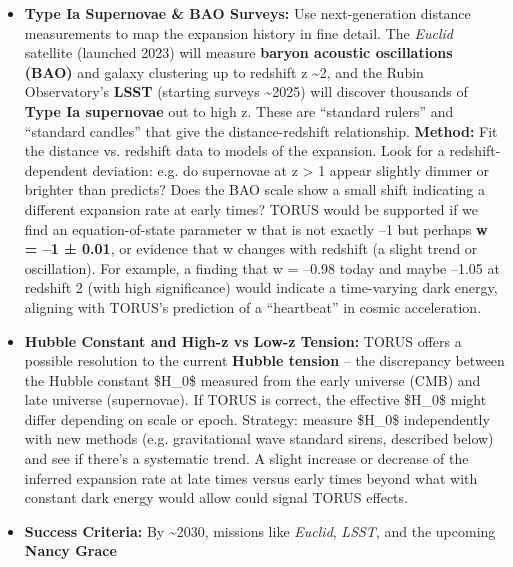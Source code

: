 \documentclass[
]{article}
\begin{document}
{\begin{itemize}
  \begin{itemize}
  \item
    \textbf{Type Ia Supernovae \& BAO Surveys:} Use next-generation
    distance measurements to map the expansion history in fine detail.
    The \emph{Euclid} satellite (launched 2023) will measure
    \textbf{baryon acoustic oscillations (BAO)} and galaxy clustering up
    to redshift z \textasciitilde2, and the Rubin Observatory's
    \textbf{LSST} (starting surveys \textasciitilde2025) will discover
    thousands of \textbf{Type Ia supernovae} out to high z. These are
    ``standard rulers'' and ``standard candles'' that give the
    distance-redshift relationship. \textbf{Method:} Fit the distance
    vs. redshift data to models of the expansion. Look for a
    redshift-dependent deviation: e.g. do supernovae at z \textgreater{}
    1 appear slightly dimmer or brighter than \LambdaCDM predicts? Does the
    BAO scale show a small shift indicating a different expansion rate
    at early times? TORUS would be supported if we find an
    equation-of-state parameter w that is not exactly --1 but perhaps
    \textbf{w = --1 ± 0.01}, or evidence that w changes with redshift (a
    slight trend or oscillation)\hspace{0pt}. For example, a finding
    that w = --0.98 today and maybe --1.05 at redshift 2 (with high
    significance) would indicate a time-varying dark energy, aligning
    with TORUS's prediction of a ``heartbeat'' in cosmic
    acceleration\hspace{0pt}.
  \item
    \textbf{Hubble Constant and High-z vs Low-z Tension:} TORUS offers a
    possible resolution to the current \textbf{Hubble tension} -- the
    discrepancy between the Hubble constant \$H\_0\$ measured from the
    early universe (CMB) and late universe (supernovae)\hspace{0pt}. If
    TORUS is correct, the effective \$H\_0\$ might differ depending on
    scale or epoch. Strategy: measure \$H\_0\$ independently with new
    methods (e.g. gravitational wave standard sirens, described below)
    and see if there's a systematic trend. A slight increase or decrease
    of the inferred expansion rate at late times versus early times
    beyond what \LambdaCDM with constant dark energy would allow could signal
    TORUS effects\hspace{0pt}.
  \item
    \textbf{Success Criteria:} By \textasciitilde2030, missions like
    \emph{Euclid}, \emph{LSST}, and the upcoming \textbf{Nancy Grace
}
\end{itemize}
\end{itemize}}
\end{document}
